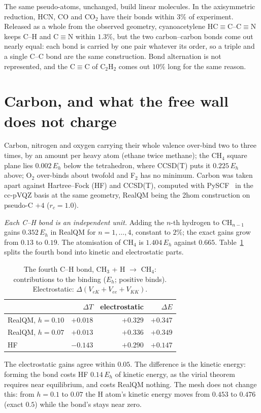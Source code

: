 The same pseudo-atoms, unchanged, build linear molecules. In the axisymmetric reduction, HCN, CO and
CO$_2$ have their bonds within 3\% of experiment. Released as a whole from the observed geometry,
cyanoacetylene HC$\equiv$C--C$\equiv$N keeps C--H and C$\equiv$N within $1.3\%$, but the two
carbon--carbon bonds come out nearly equal: each bond is carried by one pair whatever its order, so a
triple and a single C--C bond are the same construction. Bond alternation is not represented, and the
C$\equiv$C of C$_2$H$_2$ comes out $10\%$ long for the same reason.

\section{Carbon, and what the free wall does not charge}\label{sec:group16}\label{sec:rc-meaning}

Carbon, nitrogen and oxygen carrying their whole valence over-bind two to three times, by an amount per heavy
atom (ethane twice methane); the CH$_4$ square plane lies $0.002\,E_h$ below the tetrahedron, where CCSD(T)
puts it $0.225\,E_h$ above; O$_2$ over-binds about twofold and F$_2$ has no minimum. Carbon was taken apart
against Hartree--Fock (HF) and CCSD(T), computed with PySCF~\cite{pyscf} in the cc-pVQZ basis at the same
geometry, RealQM being the 2hom construction on pseudo-C $+4$ ($r_c = 1.0$).

\emph{Each C--H bond is an independent unit.} Adding the $n$-th hydrogen to CH$_{n-1}$ gains $0.352\,E_h$ in
RealQM for $n = 1,\dots,4$, constant to $2\%$; the exact gains grow from $0.13$ to $0.19$. The atomisation
of CH$_4$ is $1.404\,E_h$ against $0.665$. Table~\ref{tab:c-h-bond} splits the fourth bond into kinetic and
electrostatic parts.
\begin{table}[h]
\centering\small
\caption{The fourth C--H bond, CH$_3$ + H $\to$ CH$_4$: contributions to the binding ($E_h$; positive
binds). Electrostatic: $\Delta(V_{eK}+V_{ee}+V_{KK})$.}\label{tab:c-h-bond}
\begin{tabular}{lrrr}
\toprule
 & $\Delta T$ & electrostatic & $\Delta E$ \\
\midrule
RealQM, $h = 0.10$ & $+0.018$ & $+0.329$ & $+0.347$ \\
RealQM, $h = 0.07$ & $+0.013$ & $+0.336$ & $+0.349$ \\
HF                 & $-0.143$ & $+0.290$ & $+0.147$ \\
\bottomrule
\end{tabular}
\end{table}
The electrostatic gains agree within $0.05$. The difference is the kinetic energy: forming the bond costs
HF $0.14\,E_h$ of kinetic energy, as the virial theorem requires near equilibrium, and costs RealQM
nothing. The mesh does not change this: from $h = 0.1$ to $0.07$ the H atom's kinetic energy moves
from $0.453$ to $0.476$ (exact $0.5$) while the bond's stays near zero.

